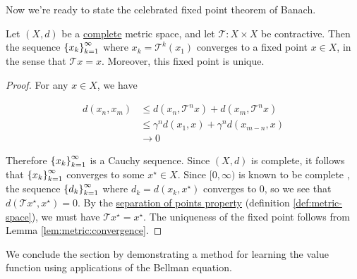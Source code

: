 Now we're ready to state the celebrated fixed point theorem of Banach.

\begin{theorem}\label{thm:banach-fixed-point}
  Let $(X, d)$ be a \hyperref[def:complete]{complete} metric space,
  and let $\mathcal{T}:X\times X$ be contractive. Then the sequence
  $\indexedint{k}{\infty}{x}$ where $x_k = \mathcal{T}^k(x_1)$ converges
  to a fixed point $x\in X$, in the sense that $\mathcal{T}x =
  x$. Moreover, this fixed point is unique.
\end{theorem}

\begin{proof}
  For any $x\in X$, we have

  \begin{align*}
    d(x_n, x_m) &\leq d(x_n, \mathcal{T}^nx) + d(x_m, \mathcal{T}^nx)\\
    &\leq \gamma^nd(x_1, x) + \gamma^nd(x_{m-n}, x)\\
    &\to 0
  \end{align*}

  Therefore $\indexedint{k}{\infty}{x}$ is a Cauchy sequence. Since
  $(X, d)$ is complete, it follows that $\indexedint{k}{\infty}{x}$
  converges to some $x^\star\in X$. Since $[0,\infty)$ is known to be
  complete \citep{kreyszig1978introductory}, the sequence
  $\indexedint{k}{\infty}{d}$ where $d_k = d(x_k, x^\star)$ converges
  to $0$, so we see that $d(\mathcal{T}x^\star, x^\star) = 0$. By the
  \hyperref[def:metric-space]{separation of points property} (definition
  \ref{def:metric-space}), we must have $\mathcal{T}x^\star =
  x^\star$. The uniqueness of the fixed point follows from Lemma
  \ref{lem:metric:convergence}.
\end{proof}

We conclude the section by demonstrating a method for learning the
value function using applications of the Bellman equation.

